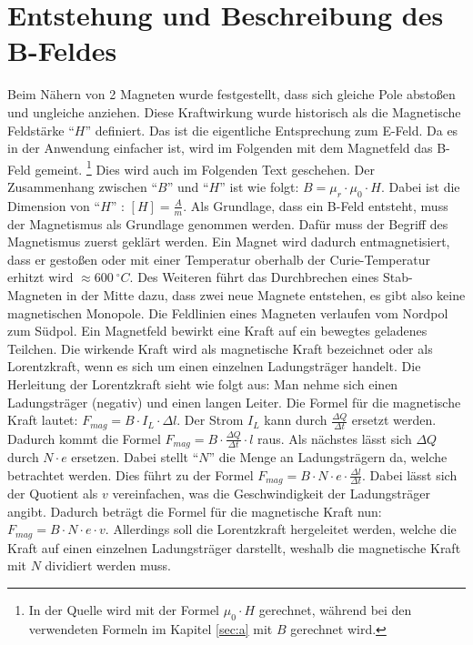 \section{Entstehung und Beschreibung des B-Feldes}
Beim Nähern von 2 Magneten wurde festgestellt, dass sich gleiche Pole abstoßen und ungleiche anziehen.
Diese Kraftwirkung wurde historisch als die Magnetische Feldstärke "`$H$"' definiert.
Das ist die eigentliche Entsprechung zum E-Feld.
Da es in der Anwendung einfacher ist, wird im Folgenden mit dem Magnetfeld das B-Feld gemeint. \footnote{In der Quelle \cite{Gente1950} wird mit der Formel $\mu_0 \cdot H$ gerechnet, während bei den verwendeten Formeln im Kapitel \ref{sec:a} mit $B$ gerechnet wird.}
Dies wird auch im Folgenden Text geschehen.
Der Zusammenhang zwischen "`$B$"' und "`$H$"' ist wie folgt: $B = \mu_r \cdot \mu_0 \cdot H$.
Dabei ist die Dimension von "`$H$"' : $[H] = \frac{A}{m}$.
Als Grundlage, dass ein B-Feld entsteht, muss der Magnetismus als Grundlage genommen werden.
Dafür muss der Begriff des Magnetismus zuerst geklärt werden.
Ein Magnet wird dadurch entmagnetisiert, dass er gestoßen oder mit einer Temperatur oberhalb der Curie-Temperatur erhitzt wird $ \approx 600 ~ ^\circ C$.
Des Weiteren führt das Durchbrechen eines Stab-Magneten in der Mitte dazu, dass zwei neue Magnete entstehen, es gibt also keine magnetischen Monopole.
Die Feldlinien eines Magneten verlaufen vom Nordpol zum Südpol.
Ein Magnetfeld bewirkt eine Kraft auf ein bewegtes geladenes Teilchen.
Die wirkende Kraft wird als magnetische Kraft bezeichnet oder als Lorentzkraft, wenn es sich um einen einzelnen Ladungsträger handelt.
Die Herleitung der Lorentzkraft sieht wie folgt aus:
Man nehme sich einen Ladungsträger (negativ) und einen langen Leiter.
Die Formel für die magnetische Kraft lautet: $F_{mag} =  B \cdot I_L \cdot \Delta l$.
Der Strom $I_L$ kann durch $\frac{\Delta Q}{\Delta t}$ ersetzt werden.
Dadurch kommt die Formel $F_{mag} = B \cdot \frac{\Delta Q}{\Delta t} \cdot l$ raus.
Als nächstes lässt sich $\Delta Q$ durch $N \cdot e$ ersetzen.
Dabei stellt "`$N$"' die Menge an Ladungsträgern da, welche betrachtet werden.
Dies führt zu der Formel $F_{mag} = B \cdot N \cdot e \cdot \frac{\Delta l}{\Delta t}$.
Dabei lässt sich der Quotient als $v$ vereinfachen, was die Geschwindigkeit der Ladungsträger angibt.
Dadurch beträgt die Formel für die magnetische Kraft nun: $F_{mag} = B \cdot N \cdot e \cdot v$.
Allerdings soll die Lorentzkraft hergeleitet werden, welche die Kraft auf einen einzelnen Ladungsträger darstellt, weshalb die magnetische Kraft mit $N$ dividiert werden muss.
